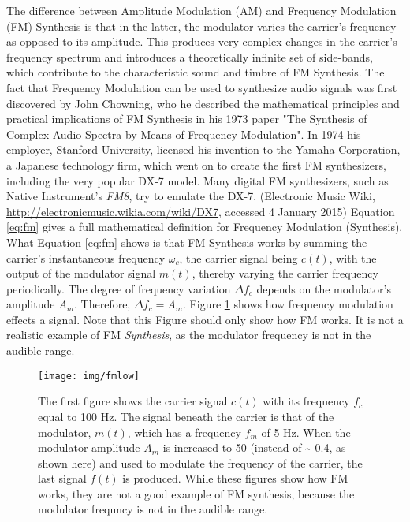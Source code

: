 The difference between Amplitude Modulation (AM) and Frequency Modulation (FM) Synthesis is that in the latter, the modulator varies the carrier's frequency as opposed to its amplitude. This produces very complex changes in the carrier's frequency spectrum and introduces a theoretically infinite set of side-bands, which contribute to the characteristic sound and timbre of FM Synthesis. The fact that Frequency Modulation can be used to synthesize audio signals was first discovered by John Chowning, who he described the mathematical principles and practical implications of FM Synthesis in his 1973 paper "The Synthesis of Complex Audio Spectra by Means of Frequency Modulation". In 1974 his employer, Stanford University, licensed his invention to the Yamaha Corporation, a Japanese technology firm, which went on to create the first FM synthesizers, including the very popular DX-7 model. Many digital FM synthesizers, such as Native Instrument's \emph{FM8}, try to emulate the DX-7. (Electronic Music Wiki, \url{http://electronicmusic.wikia.com/wiki/DX7}, accessed 4 January 2015) Equation \ref{eq:fm} gives a full mathematical definition for Frequency Modulation (Synthesis). What Equation \ref{eq:fm} shows is that FM Synthesis works by summing the carrier's instantaneous frequency $\omega_{c}$, the carrier signal being $c(t)$, with the output of the modulator signal $m(t)$, thereby varying the carrier frequency periodically. The degree of frequency variation $\Delta f_{c}$ depends on the modulator's amplitude $A_{m}$. Therefore, $\Delta f_{c} = A_{m}$. Figure \ref{fig:fmlow} shows how frequency modulation effects a signal. Note that this Figure should only show how FM works. It is not a realistic example of FM \emph{Synthesis}, as the modulator frequency is not in the audible range.

\pagebreak

\begin{figure}[]
  \texttt{[image: img/fmlow]}
  \caption{The first figure shows the carrier signal $c(t)$ with its frequency $f_{c}$ equal to 100 Hz. The signal beneath the carrier is that of the modulator, $m(t)$, which has a frequency $f_{m}$ of 5 Hz. When the modulator amplitude $A_{m}$ is increased to 50 (instead of \textasciitilde{} 0.4, as shown here) and used to modulate the frequency of the carrier, the last signal $f(t)$ is produced. While these figures show how FM works, they are not a good example of FM synthesis, because the modulator frequncy is not in the audible range.}
  \label{fig:fmlow}
\end{figure}

